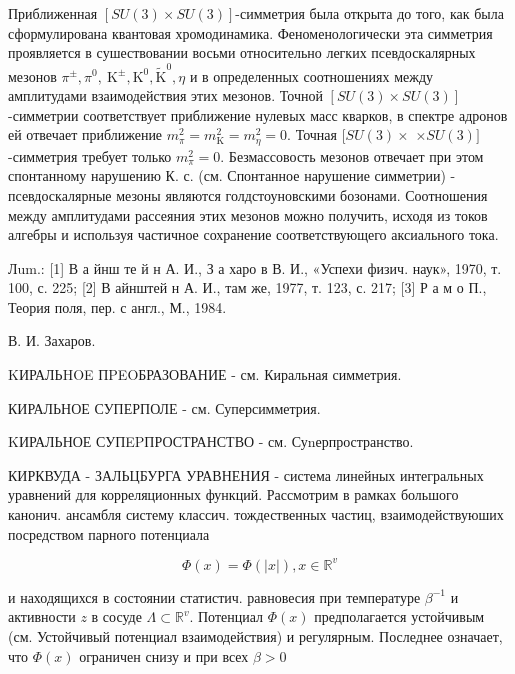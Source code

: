 \documentclass[10pt]{article}
\begin{document}
Приближенная $[S U(3) \times S U(3)]$-симметрия была открыта до того, как была сформулирована квантовая хромодинамика. Феноменологически эта симметрия проявляется в сушествовании восьми относительно легких псевдоскалярных мезонов $\pi^{ \pm}, \pi^{0}, \mathrm{~K}^{ \pm}, \mathrm{K}^{0}, \widetilde{\mathrm{K}}^{0}, \eta$ и в определенных соотношениях между амплитудами взаимодействия этих мезонов. Точной $[S U(3) \times S U(3)]$-симметрии соответствует приближение нулевых масс кварков, в спектре адронов ей отвечает приближение $m_{\pi}^{2}=m_{\mathrm{K}}^{2}=m_{\eta}^{2}=0$. Точная $[S U(3) \times$ $\times S U(3)]$-симметрия требует только $m_{\pi}^{2}=0$. Безмассовость мезонов отвечает при этом спонтанному нарушению К. с. (см. Спонтанное нарушение симметрии) - псевдоскалярные мезоны являются голдстоуновскими бозонами. Соотношения между амплитудами рассеяния этих мезонов можно получить, исходя из токов алгебры и используя частичное сохранение соответствующего аксиального тока.



Лum.: [1] В а йнш те й н А. И., З а харо в В. И., «Успехи физич. наук», 1970, т. 100, с. 225; [2] В айнштей н А. И., там же, 1977, т. 123, с. 217; [3] Р а м о П., Теория поля, пер. с англ., М., 1984.



В. И. Захаров.



KИРАЛЬHOE ПPEOБРАЗОВАНИЕ - см. Киральная симметрия.



КИРАЛЬНОЕ СУПЕРПОЛЕ - см. Суперсимметрия.



KИРАЛЬНОЕ СУПEPПРОСТРАНСТВО - см. Суnерпространство.



КИРКВУДА - ЗАЛЬЦБУРГА УРАВНЕНИЯ - система линейных интегральных уравнений для корреляционных функций. Рассмотрим в рамках большого канонич. ансамбля систему классич. тождественных частиц, взаимодействуюших посредством парного потенциала



\[

\Phi(x)=\Phi(|x|), x \in \mathbb{R}^{v}

\]



и находящихся в состоянии статистич. равновесия при температуре $\beta^{-1}$ и активности $z$ в сосуде $\Lambda \subset \mathbb{R}^{v}$. Потенциал $\Phi(x)$ предполагается устойчивым (см. Устойчивый потенциал взаимодействия) и регулярным. Последнее означает, что $\Phi(x)$ ограничен снизу и при всех $\beta>0$
\end{document}
